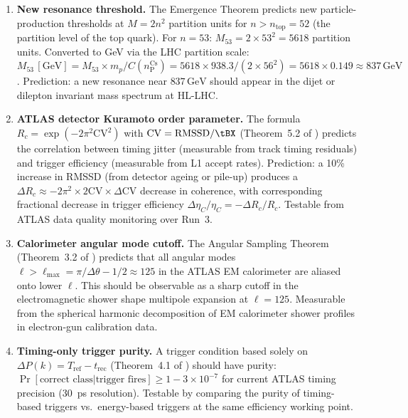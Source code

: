 \documentclass[twocolumn,10pt,a4paper]{article}
\theoremstyle{thmstyle}
\theoremstyle{definition}
\theoremstyle{remark}
\newcommand{\nP}{n_{\mathrm{P}}}
\newcommand{\etaC}{\eta_{C}}
\begin{document}
\begin{enumerate}[nosep,label=\textbf{P\arabic*.}]
\item \label{pred:threshold}
\textbf{New resonance threshold.}
The Emergence Theorem predicts new particle-production thresholds at
$M = 2n^2$ partition units for $n > n_{\mathrm{top}} = 52$
(the partition level of the top quark).
For $n = 53$: $M_{53} = 2\times53^2 = 5618$ partition units.
Converted to GeV via the LHC partition scale:
$M_{53}\,[\mathrm{GeV}] = M_{53} \times m_p/C(\nP^{\mathrm{Cs}})
= 5618 \times 938.3/(2\times56^2) = 5618\times0.149\approx 837\,\mathrm{GeV}$.
Prediction: a new resonance near $837\,\mathrm{GeV}$ should appear
in the dijet or dilepton invariant mass spectrum at HL-LHC.

\item \label{pred:kuramoto}
\textbf{ATLAS detector Kuramoto order parameter.}
The formula $R_c = \exp(-2\pi^2\mathrm{CV}^2)$ with
$\mathrm{CV} = \mathrm{RMSSD}/\tBX$ (Theorem~5.2 of \citealt{companion:qnd})
predicts the correlation between timing jitter (measurable from track
timing residuals) and trigger efficiency (measurable from L1 accept rates).
Prediction: a 10\% increase in RMSSD (from detector ageing or pile-up)
produces a $\Delta R_c \approx -2\pi^2\times2\mathrm{CV}\times\Delta\mathrm{CV}$
decrease in coherence, with corresponding fractional decrease in
trigger efficiency $\Delta\etaC/\etaC = -\Delta R_c/R_c$.
Testable from ATLAS data quality monitoring over Run~3.

\item \label{pred:angular}
\textbf{Calorimeter angular mode cutoff.}
The Angular Sampling Theorem (Theorem~3.2 of \citealt{companion:angular})
predicts that all angular modes $\ell > \ell_{\max} = \pi/\Delta\theta - 1/2 \approx 125$
in the ATLAS EM calorimeter are aliased onto lower $\ell$.
This should be observable as a sharp cutoff in the electromagnetic
shower shape multipole expansion at $\ell = 125$.
Measurable from the spherical harmonic decomposition of EM calorimeter
shower profiles in electron-gun calibration data.

\item \label{pred:incorruptibility}
\textbf{Timing-only trigger purity.}
A trigger condition based solely on $\Delta P(k) = T_{\mathrm{ref}} - t_{\mathrm{rec}}$
(Theorem~4.1 of \citealt{companion:timing}) should have purity:
$\Pr[\text{correct class} | \text{trigger fires}] \geq 1 - 3\times10^{-7}$
for current ATLAS timing precision (30~ps resolution).
Testable by comparing the purity of timing-based triggers vs.\
energy-based triggers at the same efficiency working point.

\end{enumerate}
\end{document}
